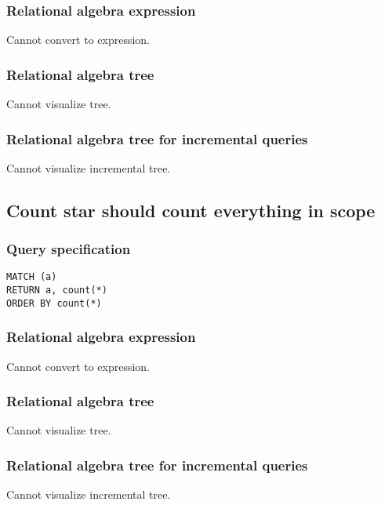 \subsubsection*{Relational algebra expression}

Cannot convert to expression.

\subsubsection*{Relational algebra tree}

Cannot visualize tree.

\subsubsection*{Relational algebra tree for incremental queries}

Cannot visualize incremental tree.

\subsection{Count star should count everything in scope}

\subsubsection*{Query specification}

\begin{lstlisting}
MATCH (a)
RETURN a, count(*)
ORDER BY count(*)
\end{lstlisting}

\subsubsection*{Relational algebra expression}

Cannot convert to expression.

\subsubsection*{Relational algebra tree}

Cannot visualize tree.

\subsubsection*{Relational algebra tree for incremental queries}

Cannot visualize incremental tree.

